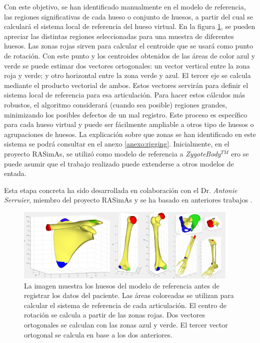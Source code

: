 Con este objetivo, se han identificado manualmente\del{,} en el modelo de referencia, las regiones significativas de cada hueso o conjunto de huesos, a partir del cual se calculará el sistema local de referencia del hueso virtual. En la figura \ref{fig:humero}, se pueden apreciar las distintas regiones seleccionadas para una muestra de diferentes huesos. 
Las zonas rojas sirven para calcular el centroide que se usará como punto de rotación. Con este punto y los centroides obtenidos de las áreas de color azul y verde\new{,} se puede estimar dos vectores ortogonales: un vector vertical entre la zona roja y verde; y otro horizontal entre la zona verde y azul. El tercer eje se calcula mediante el producto vectorial de ambos. Estos vectores servirán para definir el sistema local de referencia para esa articulación. Para hacer estos cálculos más robustos, el algoritmo considerará (cuando sea posible) regiones grandes, minimizando los posibles defectos de un mal registro. Este proceso es específico para cada hueso virtual y puede ser fácilmente ampliable a otros tipo de huesos o agrupaciones de huesos. La explicación sobre que zonas se han identificado en este sistema se podrá consultar en el anexo \ref{anexo:rigging}. 
%
Inicialmente, en el proyecto \ac{RASimAs}, se utilizó como modelo de referencia a  \emph{ZygoteBody}$^{TM}$ ero se puede asumir que el trabajo realizado puede extenderse a otros modelos de entada.


Esta etapa concreta ha sido desarrollada en colaboración con el Dr. \emph{Antonie Serruier}, miembro del proyecto \ac{RASimAs} y se ha basado en anteriores trabajos \cite{QUIJANO20131703}.

\begin{figure}
   \centering
    \includegraphics[width=0.95\textwidth]{IMG/rigshoulder.png}%
    \caption{La imagen muestra los huesos del modelo de referencia antes de registrar los datos del paciente. Las áreas coloreadas se utilizan para calcular el sistema de referencia de cada articulación. El centro de rotación se calcula a partir de las zonas rojas. Dos vectores ortogonales se calculan con las zonas azul y verde. El tercer vector ortogonal se calcula en base a los dos anteriores.}
\label{fig:humero}
\end{figure}


